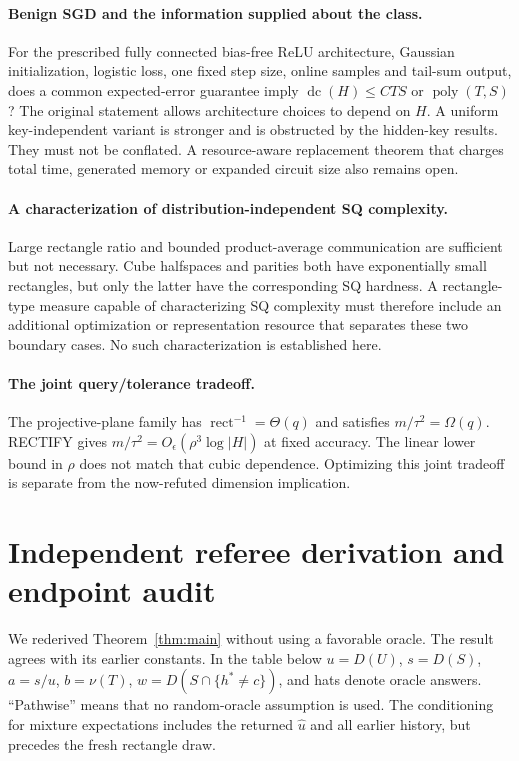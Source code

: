 \documentclass[11pt]{article}
\DeclareMathOperator{\dc}{dc}
\DeclareMathOperator{\rect}{rect}
\newcommand{\1}{\mathbf 1}
\begin{document}
\paragraph{Benign SGD and the information supplied about the class.}
For the prescribed fully connected bias-free ReLU architecture, Gaussian initialization, logistic loss, one fixed step size, online samples and tail-sum output, does a common expected-error guarantee imply $\dc(H)\le CTS$ or $\operatorname{poly}(T,S)$? The original statement allows architecture choices to depend on $H$. A uniform key-independent variant is stronger and is obstructed by the hidden-key results. They must not be conflated. A resource-aware replacement theorem that charges total time, generated memory or expanded circuit size also remains open.

\paragraph{A characterization of distribution-independent SQ complexity.}
Large rectangle ratio and bounded product-average communication are sufficient but not necessary. Cube halfspaces and parities both have exponentially small rectangles, but only the latter have the corresponding SQ hardness. A rectangle-type measure capable of characterizing SQ complexity must therefore include an additional optimization or representation resource that separates these two boundary cases. No such characterization is established here.

\paragraph{The joint query/tolerance tradeoff.}
The projective-plane family has $\rect^{-1}=\Theta(q)$ and satisfies $m/\tau^2=\Omega(q)$. RECTIFY gives $m/\tau^2=O_\epsilon(\rho^3\log|H|)$ at fixed accuracy. The linear lower bound in $\rho$ does not match that cubic dependence. Optimizing this joint tradeoff is separate from the now-refuted dimension implication.


\clearpage
\appendix

\section{Independent referee derivation and endpoint audit}\label{app:referee}
We rederived Theorem~\ref{thm:main} without using a favorable oracle. The result agrees with its earlier constants. In the table below $u=D(U)$, $s=D(S)$, $a=s/u$, $b=\nu(T)$, $w=D(S\cap\{h^*\ne c\})$, and hats denote oracle answers. ``Pathwise'' means that no random-oracle assumption is used. The conditioning for mixture expectations includes the returned $\widehat u$ and all earlier history, but precedes the fresh rectangle draw.
\end{document}
